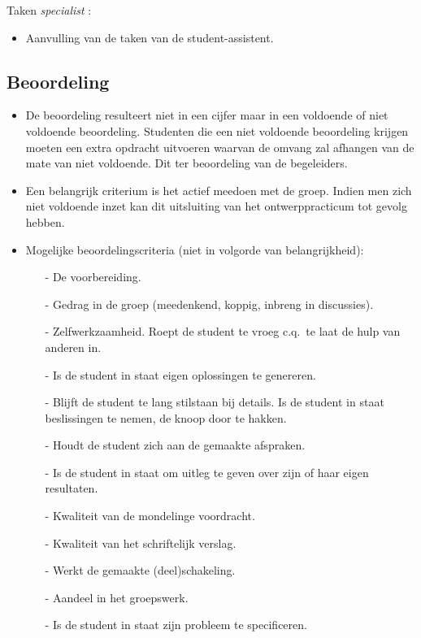 \vglue 20pt
Taken {\it specialist} :
\begin{itemize}
\item
Aanvulling van de taken van de student-assistent.
\end{itemize}

\subsection{Beoordeling}

\begin{itemize}
\item
De beoordeling resulteert niet in een cijfer maar in een voldoende of
niet voldoende beoor\-de\-ling. Studenten die een niet voldoende
beoordeling krijgen moeten een extra opdracht uitvoeren waarvan de
omvang zal afhangen van de mate van niet voldoende. Dit ter
beoordeling van de begeleiders.
\item
Een belangrijk criterium is het actief meedoen met de groep. Indien men
zich niet voldoende inzet kan dit uitsluiting van het ontwerppracticum tot
gevolg hebben.
\item
Mogelijke beoordelingscriteria (niet in volgorde van belangrijkheid):
\begin{enumerate}
\item[-]
De voorbereiding.
\item[-]
Gedrag in de groep (meedenkend, koppig, inbreng
in discussies).
\item[-]
Zelfwerkzaamheid. Roept de student te vroeg c.q.\ te laat de hulp van
anderen in.
\item[-]
Is de student in staat eigen oplossingen te genereren.
\item[-]
Blijft de student te lang stilstaan bij details. Is de student in
staat beslissingen te nemen, de knoop door te hakken.
\item[-] Houdt de student zich aan de gemaakte afspraken.
\item[-] Is de student in staat om uitleg te geven over zijn of haar
eigen resultaten.
\item[-] Kwaliteit van de mondelinge voordracht.
\item[-] Kwaliteit van het schriftelijk verslag.
\item[-]
Werkt de gemaakte (deel)schakeling.
\item[-] Aandeel in het groepswerk.
\item[-] Is de student in staat zijn probleem te specificeren.
\end{enumerate}
\end{itemize}

\cleardoublepage

